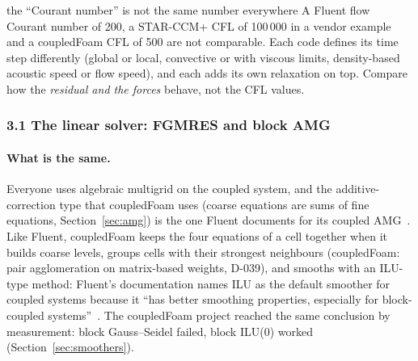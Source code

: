 \begin{whyitmatters}{the ``Courant number'' is not the same number everywhere}
  A Fluent flow Courant number of 200, a STAR-CCM+ CFL of 100\,000 in a
  vendor example~\cite{cmp-StarAutoCFL2020} and a coupledFoam CFL of 500
  are not comparable. Each code defines its time step differently (global
  or local, convective or with viscous limits, density-based acoustic
  speed or flow speed), and each adds its own relaxation on top. Compare
  how the \emph{residual and the forces} behave, not the CFL values.
\end{whyitmatters}

\subsubsection*{3.1 The linear solver: FGMRES and block AMG}

\paragraph{What is the same.} Everyone uses algebraic multigrid on the
coupled system, and the additive-correction type that coupledFoam uses
(coarse equations are sums of fine equations,
Section~\ref{sec:amg}) is the one Fluent documents for its coupled
AMG~\cite{cmp-Fluent12TG,Hutchinson1986,Weiss1999}. Like Fluent, coupledFoam
keeps the four equations of a cell together when it builds coarse levels,
groups cells with their strongest neighbours (coupledFoam: pair
agglomeration on matrix-based weights, D-039), and smooths with an ILU-type
method: Fluent's documentation names ILU as the default smoother for
coupled systems because it ``has better smoothing properties, especially
for block-coupled systems''~\cite{cmp-Fluent12TG,cmp-Fluent12UG}. The
coupledFoam project reached the same conclusion by measurement: block
Gauss--Seidel failed, block ILU(0) worked (Section~\ref{sec:smoothers}).

